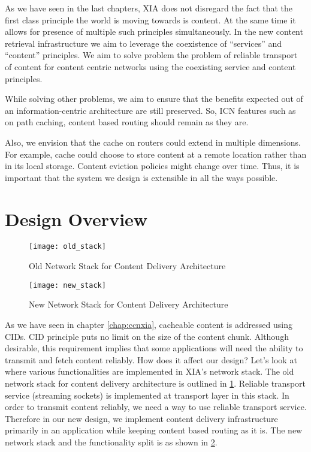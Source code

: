 As we have seen in the last chapters, XIA does not disregard the fact
that the first class principle the world is moving towards is
content. At the same time it allows for presence of multiple such
principles simultaneously. In the new content retrieval infrastructure
we aim to leverage the coexistence of “services” and “content”
principles. We aim to solve problem the problem of reliable transport
of content for content centric networks using the coexisting service
and content principles.

While solving other problems, we aim to ensure that the benefits
expected out of an information-centric architecture are still
preserved. So, ICN features such as on path caching, content based
routing should remain as they are.

Also, we envision that the cache on routers could extend in multiple
dimensions. For example, cache could choose to store content at a
remote location rather than in its local storage. Content eviction
policies might change over time.  Thus, it is important that the
system we design is extensible in all the ways possible.

\section{Design Overview}

\begin{figure}
  \begin{center}
    \texttt{[image: old\_stack]}
    \caption{Old Network Stack for Content Delivery Architecture}
    \label{fig:old_stack}
  \end{center}
\end{figure}

\begin{figure}
  \begin{center}
    \texttt{[image: new\_stack]}
    \caption{New Network Stack for Content Delivery Architecture}
    \label{fig:new_stack}
  \end{center}
\end{figure}
As we have seen in chapter \ref{chap:ccnxia}, cacheable content is
addressed using CIDs. CID principle puts no limit on the size of the
content chunk. Although desirable, this requirement implies that some
applications will need the ability to transmit and fetch content
reliably. How does it affect our design?  Let’s look at where various
functionalities are implemented in XIA’s network stack. The old
network stack for content delivery architecture is outlined in
\ref{fig:old_stack}. Reliable transport service (streaming sockets) is
implemented at transport layer in this stack. In order to transmit
content reliably, we need a way to use reliable transport
service. Therefore in our new design, we implement content delivery
infrastructure primarily in an application while keeping content based
routing as it is. The new network stack and the functionality split is
as shown in \ref{fig:new_stack}.

